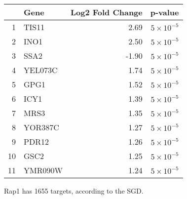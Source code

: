 \documentclass{beamer}
\begin{document}
\begin{frame}
    \begin{table}[ht]
        \centering
        \begin{tabular}{rlrr}
            \toprule
            & Gene & Log2 Fold Change & p-value \\ 
            \midrule
            1 & TIS11 & 2.69 & $5 \times 10^{-5}$ \\ 
            2 & INO1 & 2.50 & $5 \times 10^{-5}$\\ 
            3 & SSA2 & -1.90 & $5 \times 10^{-5}$ \\ 
            4 & YEL073C & 1.74 & $5 \times 10^{-5}$ \\ 
            5 & GPG1 & 1.52 & $5 \times 10^{-5}$ \\ 
            6 & ICY1 & 1.39 & $5 \times 10^{-5}$ \\ 
            7 & MRS3 & 1.35 & $5 \times 10^{-5}$ \\ 
            8 & YOR387C & 1.27 & $5 \times 10^{-5}$ \\ 
            9 & PDR12 & 1.26 & $5 \times 10^{-5}$ \\ 
            10 & GSC2 & 1.25 & $5 \times 10^{-5}$ \\ 
            11 & YMR090W & 1.24 & $5 \times 10^{-5}$ \\ 
            \bottomrule
        \end{tabular}
    \end{table}
    \pause
    Rap1 has 1655 targets, according to the SGD. 
\end{frame}
\end{document}
